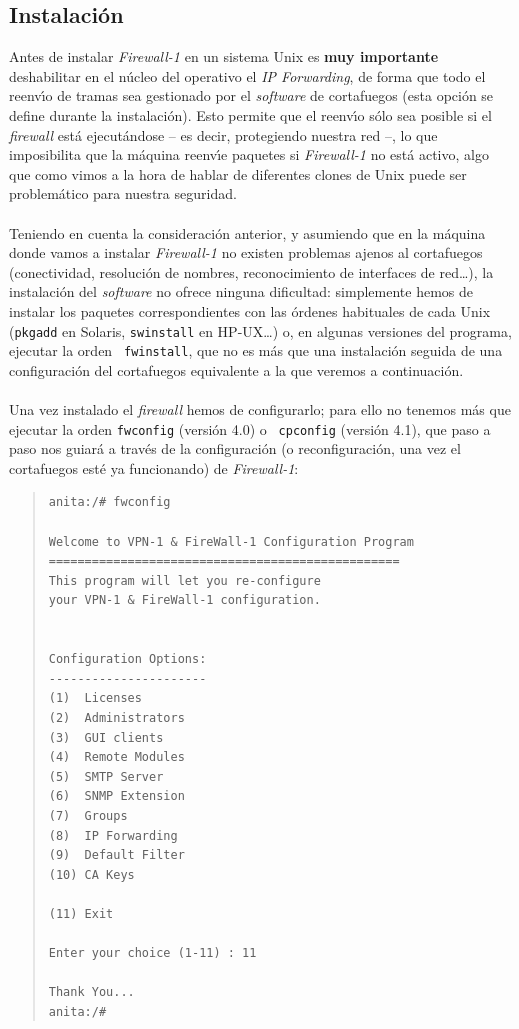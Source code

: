 \subsection{Instalaci\'on}
Antes de instalar {\it Firewall-1} en un sistema Unix es {\bf muy importante} 
deshabilitar en el n\'ucleo del operativo el {\it IP Forwarding}, de forma que
todo el reenv\'{\i}o de tramas sea gestionado por el {\it software} de
cortafuegos (esta opci\'on se define durante la instalaci\'on). Esto permite 
que el reenv\'{\i}o s\'olo sea posible si el {\it
firewall} est\'a ejecut\'andose -- es decir, protegiendo nuestra red --, lo que
imposibilita que la m\'aquina reenv\'{\i}e paquetes si {\it Firewall-1} no
est\'a activo, algo que como vimos a la hora de hablar de diferentes clones de
Unix puede ser problem\'atico para nuestra seguridad.\\
\\Teniendo en cuenta la consideraci\'on anterior, y asumiendo que en la 
m\'aquina donde vamos a instalar {\it Firewall-1} no existen problemas ajenos
al cortafuegos (conectividad, resoluci\'on de nombres, reconocimiento de 
interfaces de red\ldots), la instalaci\'on del {\it software} no ofrece ninguna 
dificultad: simplemente hemos de instalar los paquetes correspondientes con las 
\'ordenes habituales de cada Unix ({\tt pkgadd} en Solaris, {\tt swinstall} en
HP-UX\ldots) o, en algunas versiones del programa, ejecutar la orden {\tt 
fwinstall}, que no es m\'as que una instalaci\'on seguida de una 
configuraci\'on del cortafuegos equivalente a la que veremos a continuaci\'on.\\
\\Una vez instalado el {\it firewall} hemos de configurarlo; para ello no 
tenemos m\'as que ejecutar la orden {\tt fwconfig} (versi\'on 4.0) o {\tt 
cpconfig} (versi\'on 4.1), que paso a paso nos guiar\'a a trav\'es de la 
configuraci\'on (o reconfiguraci\'on, una vez el cortafuegos est\'e ya
funcionando) de {\it Firewall-1}: 
\begin{quote}
\begin{verbatim}
anita:/# fwconfig

Welcome to VPN-1 & FireWall-1 Configuration Program
=================================================
This program will let you re-configure
your VPN-1 & FireWall-1 configuration.


Configuration Options:
----------------------
(1)  Licenses
(2)  Administrators
(3)  GUI clients
(4)  Remote Modules
(5)  SMTP Server
(6)  SNMP Extension
(7)  Groups
(8)  IP Forwarding
(9)  Default Filter
(10) CA Keys

(11) Exit

Enter your choice (1-11) : 11

Thank You...
anita:/#
\end{verbatim}
\end{quote}
